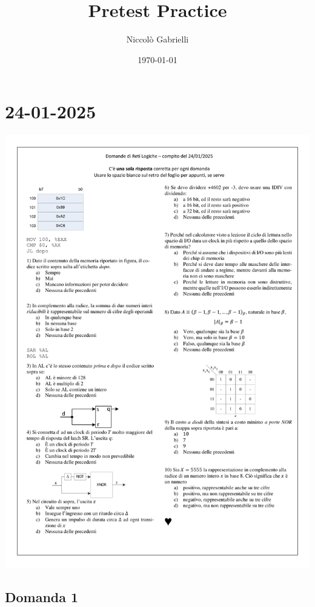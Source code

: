 \documentclass[a4paper,12pt]{article}
\title{Pretest Practice}
\author{Niccolò Gabrielli}
\date{\today}
\begin{document}
\maketitle

\tableofcontents
\newpage


\section{24-01-2025}

\includegraphics[width = \textwidth]{pretestImage/Domande RL 20250124.pdf}

\subsection{Domanda 1}
\end{document}
